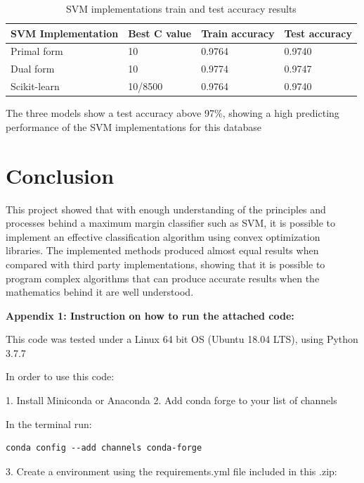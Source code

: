 \documentclass[11pt,twocolumn,letterpaper]{article}
\begin{document}
\begin{table}[h]
	\begin{center}
		\begin{tabular}{|p{2cm}|p{1.5cm}|p{1.5cm}|p{1.5cm}|}
			\hline
			SVM Implementation & Best C value & Train accuracy & Test accuracy \\
			\hline\hline
			Primal form & 10 & 0.9764 & 0.9740\\
			Dual form & 10 & 0.9774 & 0.9747\\
			Scikit-learn & 10/8500 & 0.9764 & 0.9740\\
			\hline
		\end{tabular}
	\end{center}
	\caption{SVM implementations train and test accuracy results}
	\label{table:results}
\end{table}

The three models show a test accuracy above 97\%, showing a high predicting performance of the SVM implementations for this database

\section{Conclusion}

This project showed that with enough understanding of the principles and processes behind a maximum margin classifier such as SVM, it is possible to implement an effective classification algorithm using convex optimization libraries. The implemented methods produced almost equal results when compared with third party implementations, showing that it is possible to program complex algorithms that can produce accurate results when the mathematics behind it are well understood.

{\small


}


\textbf{Appendix 1: Instruction on how to run the attached code:}

This code was tested under a Linux 64 bit OS (Ubuntu 18.04 LTS), using Python 3.7.7

In order to use this code:

1. Install Miniconda or Anaconda
2. Add conda forge to your list of channels

In the terminal run:
\begin{verbatim}
conda config --add channels conda-forge
\end{verbatim}

3. Create a environment using the requirements.yml file included in this .zip:
\end{document}
